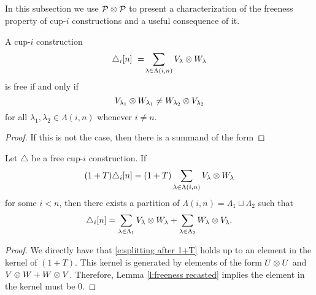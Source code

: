 \subsection{}

In this subsection we use $\mathcal{P} \otimes \mathcal{P}$ to present a characterization of the freeness property of cup-$i$ constructions and a useful consequence of it.

\begin{lemma} \label{l:freeness recasted}
	A cup-$i$ construction
	\[
	\triangle_i [n] \ = \! \sum_{\lambda \in \Lambda(i,n)} {V_\lambda} \otimes {W_\lambda}
	\]
	is free if and only if
	\[
	{V_{\lambda_1}} \otimes {W_{\lambda_1}} \neq
	{W_{\lambda_2}} \otimes {V_{\lambda_2}}
	\]
	for all $\lambda_1, \lambda_2 \in \Lambda(i,n)$ whenever $i \neq n$.
\end{lemma}

\begin{proof}
	If this is not the case, then there is a summand of the form
\end{proof}

\begin{lemma} \label{l:(1+T) triangle = 0 implies triangle = 0}
    Let $\triangle$ be a free cup-$i$ construction.
    If
    \[
    (1+T) \triangle_i [n] =
    (1+T) \sum_{\lambda \in \Lambda(i,n)} {V_\lambda} \otimes {W_\lambda}
    \]
    for some $i < n$, then there exists a partition of $\Lambda(i,n) = \Lambda_1 \sqcup \Lambda_2$ such that
    \begin{equation} \label{e:splitting after 1+T}
    \triangle_i [n] =
    \sum_{\lambda \in \Lambda_1} {V_\lambda} \otimes {W_\lambda} +
    \sum_{\lambda \in \Lambda_2} {W_\lambda} \otimes {V_\lambda}.
    \end{equation}
\end{lemma}

\begin{proof}
	We directly have that \eqref{e:splitting after 1+T} holds up to an element in the kernel of $(1+T)$.
	This kernel is generated by elements of the form $U \otimes U$ and $V \otimes W + W \otimes V$.
	Therefore, Lemma \ref{l:freeness recasted} implies the element in the kernel must be $0$.
\end{proof}